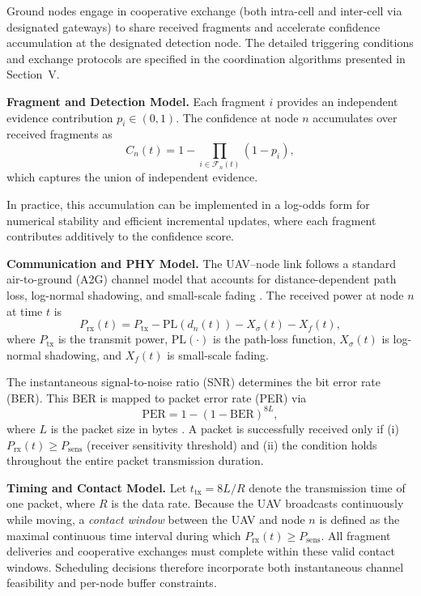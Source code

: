 \documentclass[conference]{IEEEtran}
\begin{document}
Ground nodes engage in cooperative exchange (both intra-cell and inter-cell via designated gateways) to share received fragments and accelerate confidence accumulation at the designated detection node. The detailed triggering conditions and exchange protocols are specified in the coordination algorithms presented in Section~V.

\noindent\textbf{Fragment and Detection Model.}
Each fragment \(i\) provides an independent evidence contribution \(p_i \in (0,1)\). 
The confidence at node \(n\) accumulates over received fragments as
\begin{equation}
C_n(t) = 1 - \prod_{i \in \mathcal{F}_n(t)} (1 - p_i),
\end{equation}
which captures the union of independent evidence.

In practice, this accumulation can be implemented in a log-odds form for numerical stability and efficient incremental updates, where each fragment contributes additively to the confidence score.

\noindent\textbf{Communication and PHY Model.}
The UAV--node link follows a standard air-to-ground (A2G) channel model that accounts for distance-dependent path loss, log-normal shadowing, and small-scale fading \cite{alhourani2014modeling}. The received power at node \(n\) at time \(t\) is
\begin{equation}
P_{\mathrm{rx}}(t) = P_{\mathrm{tx}} - \mathrm{PL}(d_n(t)) - X_{\sigma}(t) - X_f(t),
\end{equation}
where \(P_{\mathrm{tx}}\) is the transmit power, \(\mathrm{PL}(\cdot)\) is the path-loss function, \(X_{\sigma}(t)\) is log-normal shadowing, and \(X_f(t)\) is small-scale fading.

The instantaneous signal-to-noise ratio (SNR) determines the bit error rate (BER). This BER is mapped to packet error rate (PER) via
\begin{equation}
\mathrm{PER} = 1 - (1 - \mathrm{BER})^{8L},
\end{equation}
where \(L\) is the packet size in bytes \cite{alhourani2014modeling}. A packet is successfully received only if (i) \(P_{\mathrm{rx}}(t) \ge P_{\mathrm{sens}}\) (receiver sensitivity threshold) and (ii) the condition holds throughout the entire packet transmission duration.

\noindent\textbf{Timing and Contact Model.}
Let \(t_{\mathrm{tx}} = 8L / R\) denote the transmission time of one packet, where \(R\) is the data rate. Because the UAV broadcasts continuously while moving, a \emph{contact window} between the UAV and node \(n\) is defined as the maximal continuous time interval during which \(P_{\mathrm{rx}}(t) \ge P_{\mathrm{sens}}\). All fragment deliveries and cooperative exchanges must complete within these valid contact windows. Scheduling decisions therefore incorporate both instantaneous channel feasibility and per-node buffer constraints.
\end{document}
